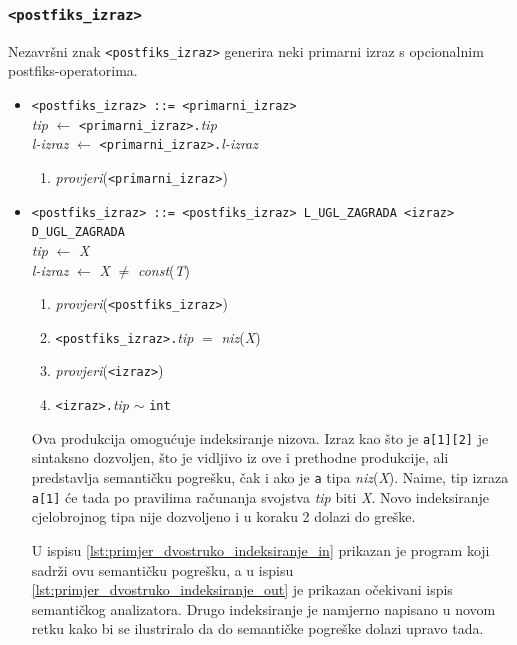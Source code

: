 \documentclass[times, 12pt, utf8]{book}
\begin{document}
\subsubsection{\texttt{<postfiks\_izraz>}}

Nezavršni znak \verb|<postfiks_izraz>| generira neki primarni izraz s opcionalnim postfiks-operatorima.

\begin{itemize}

\item
\verb|<postfiks_izraz> ::= <primarni_izraz>|\\
\emph{tip} \(\leftarrow\) \verb|<primarni_izraz>.|\emph{tip}\\
\emph{l-izraz} \(\leftarrow\) \verb|<primarni_izraz>.|\emph{l-izraz}
\begin{enumerate}
\item
\emph{provjeri}(\verb|<primarni_izraz>|)
\end{enumerate}

\item
\verb|<postfiks_izraz> ::= <postfiks_izraz> L_UGL_ZAGRADA <izraz> D_UGL_ZAGRADA|\\
\emph{tip} \(\leftarrow\) \emph{X}\\
\emph{l-izraz} \(\leftarrow\) \emph{X} \(\neq\) \emph{const}(\emph{T})
\begin{enumerate}
\item
\emph{provjeri}(\verb|<postfiks_izraz>|)
\item
\verb|<postfiks_izraz>.|\emph{tip} \(=\) \emph{niz}(\emph{X})
\item
\emph{provjeri}(\verb|<izraz>|)
\item
\verb|<izraz>.|\emph{tip} \(\sim\) \verb|int| 
\end{enumerate}

Ova produkcija omogućuje indeksiranje nizova.
Izraz kao što je \verb|a[1][2]| je sintaksno dozvoljen, što je vidljivo iz ove i prethodne produkcije, ali predstavlja semantičku pogrešku, čak i ako je \verb|a| tipa \emph{niz}(\emph{X}).
Naime, tip izraza \verb|a[1]| će tada po pravilima računanja svojstva \emph{tip} biti \emph{X}.
Novo indeksiranje cjelobrojnog tipa nije dozvoljeno i u koraku 2 dolazi do greške.

U ispisu \ref{lst:primjer_dvostruko_indeksiranje_in} prikazan je program koji sadrži ovu semantičku pogrešku, a u ispisu \ref{lst:primjer_dvostruko_indeksiranje_out} je prikazan očekivani ispis semantičkog analizatora.
Drugo indeksiranje je namjerno napisano u novom retku kako bi se ilustriralo da do semantičke pogreške dolazi upravo tada.


\end{itemize}
\end{document}
